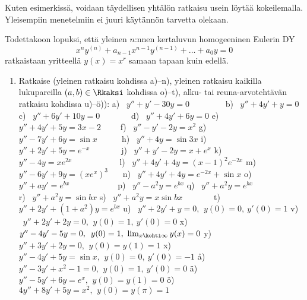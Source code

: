 Kuten esimerkissä, voidaan täydellisen yhtälön ratkaisu usein löytää kokeilemalla. Yleisempiin
menetelmiin ei juuri käytännön tarvetta olekaan. 

Todettakoon lopuksi, että yleinen $n$:nnen kertaluvun homogeeninen Eulerin DY
\[
x^{n}y^{(n)}+a_{n-1}x^{n-1}y^{(n-1)}+ \ldots + a_0y = 0
\]
ratkaistaan yritteellä $y(x)=x^r$ samaan tapaan kuin edellä.

\Harj
\begin{enumerate}

\item
Ratkaise (yleinen ratkaisu kohdissa a)--n), yleinen ratkaisu kaikilla lukupareilla
$(a,b)\in\Rkaksi$ kohdissa o)--t), alku- tai reuna-arvotehtävän ratkaisu 
kohdissa u)--ö)): \vspace{1mm}\newline
a) \ $y''+y'-30y=0 \qquad\qquad$
b) \ $y''+4y'+y= 0$ \newline
c) \ $y''+6y'+10y=0 \qquad\quad\ \ $
d) \ $y''+4y'+6y=0$ \newline
e) \ $y''+4y'+5y=3x-2 \qquad$
f) \ $y''-y'-2y=x^2$ \newline
g) \ $y''-7y'+6y=\sin x \qquad\,\ \ $
h) \ $y''+4y=\sin 3x$ \newline
i) \ $y''+2y'+5y=e^{-x} \qquad\quad\ \ $
j) \ $y''+y'-2y=x+e^x$ \newline
k) \ $y''-4y=xe^{2x} \qquad\qquad\quad\,\ $
l) \ $y''+4y'+4y=(x-1)^2e^{-2x}$ \newline
m) \ $y''-6y'+9y=(xe^x)^3 \quad\ \ $
n) \ $y''+4y'+4y=e^{-2x}+\sin x$ \newline
o) \ $y''+ay'=e^{bx} \qquad\qquad\quad\ \ $
p) \ $y''-a^2y=e^{bx}$ \newline
q) \ $y''+a^2y=e^{bx} \qquad\qquad\quad\,\ $
r) \ $y''+a^2y=\sin bx$ \newline
s) \ $y''+a^2y=x\sin bx \qquad\quad\ \ $
t) \ $y''+2y'+(1+a^2)y=e^{bx}$ \newline
u) \ $y''+2y'+y=0,\,\ y(0)=0,\ y'(0)=1$ \newline
v) \ $y''+2y'+2y=0,\,\ y(0)=1,\ y'(0)=0$ \newline
x) \ $y''-4y'-5y=0,\,\ y(0)=1,\ \lim_{x\kohti\infty}y(x)=0$ \newline
y) \ $y''+3y'+2y=0,\,\ y(0)=y(1)=1$ \newline
x) \ $y''-4y'+5y=\sin x,\,\ y(0)=0,\ y'(0)=-1$ \newline
å) \ $y''-3y'+x^2-1=0,\,\ y(0)=1,\ y'(0)=0$ \newline
ä) \ $y''-5y'+6y=e^x,\,\ y(0)=y(1)=0$ \newline
ö) \ $4y''+8y'+5y=x^2,\,\ y(0)=y(\pi)=1$


\end{enumerate}
